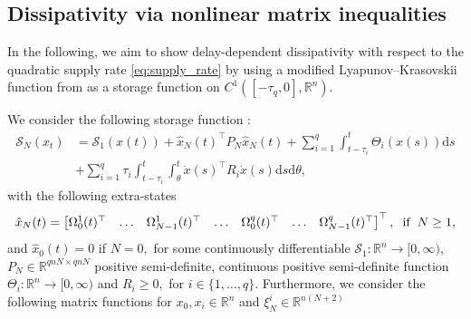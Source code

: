 \documentclass[12pt]{article}
\begin{document}
\subsection{Dissipativity via nonlinear matrix inequalities}
In the following, we aim to show delay-dependent dissipativity with respect to the quadratic supply rate  \eqref{eq:supply_rate} by using a modified Lyapunov--Krasovskii function from \cite{seuret2015hierarchy} as a storage function on $C^1([-\tau_q,0],\mathbb{R}^n).$ 

We consider the following storage function :
\begin{equation}
\begin{split}\label{eq:storage_fixed_delay_nonlinear}
\mathcal{S}_N(x_t) &= \mathcal{S}_1(x(t))+\hat{x}_{N}(t)^\top P_{N} \hat{x}_{N}(t) + 
\sum_{i=1}^q \int_{t-\tau_i}^{t} \Theta_i( x(s) )\mathrm{d}s\\
&+ \sum_{i=1}^q \tau_i \int_{t-\tau_i}^{t} \int_{\theta}^{t} \dot{x}(s)^\top R_i\dot{x}(s) 
\mathrm{d}s \mathrm{d}\theta,
\end{split}
\end{equation}
with the following extra-states 
\begin{equation*}
\hat{x}_{N}(t) = \begin{bmatrix}
\Omega_0^{1}(t)^\top & 
\ldots &\Omega_{N-1}^{1}(t)^\top &
\ldots &
\Omega_{0}^{q}(t)^\top & \ldots &  \Omega_{N-1}^{q}(t)^\top
\end{bmatrix}^\top, \hspace{2mm} \text{if} \hspace{2mm} N \geq 1,
\end{equation*} 
and $\hat{x}_0(t)=0$ if $N=0,$ 
for some continuously differentiable $\mathcal{S}_1:\mathbb{R}^n\rightarrow[0,\infty)$, $P_N\in \mathbb{R}^{qnN \times qnN}$ positive semi-definite, continuous positive semi-definite function 
$\Theta_i:\mathbb{R}^n\rightarrow[0,\infty)$ and $R_i\geq 0,$ for $i \in \{1,\ldots,q\}.$ Furthermore, we consider the following matrix functions for $x_0,x_i\in\mathbb{R}^n$  and $\xi_N^i\in \mathbb{R}^{n(N+2)}$ 
\end{document}
